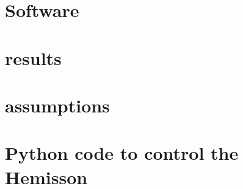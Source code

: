 \documentclass[a4paper, 12pt, titlepage]{article}
\begin{document}
\section{Software}


\section{results} %

\section{assumptions} %


\newpage
\appendix

\section{Python code to control the Hemisson} %
\label{python}
\end{document}
